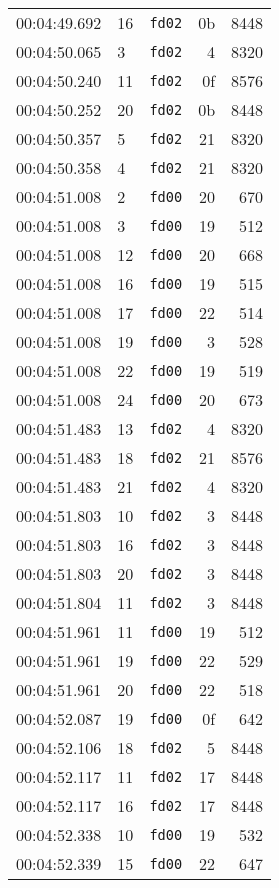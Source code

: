 \documentclass{article}
\begin{document}
\begin{longtable}{lllrr}
00:04:49.692 & 16 & \texttt{fd02} & 0b & 8448 \\
00:04:50.065 & 3 & \texttt{fd02} & 4 & 8320 \\
00:04:50.240 & 11 & \texttt{fd02} & 0f & 8576 \\
00:04:50.252 & 20 & \texttt{fd02} & 0b & 8448 \\
00:04:50.357 & 5 & \texttt{fd02} & 21 & 8320 \\
00:04:50.358 & 4 & \texttt{fd02} & 21 & 8320 \\
00:04:51.008 & 2 & \texttt{fd00} & 20 & 670 \\
00:04:51.008 & 3 & \texttt{fd00} & 19 & 512 \\
00:04:51.008 & 12 & \texttt{fd00} & 20 & 668 \\
00:04:51.008 & 16 & \texttt{fd00} & 19 & 515 \\
00:04:51.008 & 17 & \texttt{fd00} & 22 & 514 \\
00:04:51.008 & 19 & \texttt{fd00} & 3 & 528 \\
00:04:51.008 & 22 & \texttt{fd00} & 19 & 519 \\
00:04:51.008 & 24 & \texttt{fd00} & 20 & 673 \\
00:04:51.483 & 13 & \texttt{fd02} & 4 & 8320 \\
00:04:51.483 & 18 & \texttt{fd02} & 21 & 8576 \\
00:04:51.483 & 21 & \texttt{fd02} & 4 & 8320 \\
00:04:51.803 & 10 & \texttt{fd02} & 3 & 8448 \\
00:04:51.803 & 16 & \texttt{fd02} & 3 & 8448 \\
00:04:51.803 & 20 & \texttt{fd02} & 3 & 8448 \\
00:04:51.804 & 11 & \texttt{fd02} & 3 & 8448 \\
00:04:51.961 & 11 & \texttt{fd00} & 19 & 512 \\
00:04:51.961 & 19 & \texttt{fd00} & 22 & 529 \\
00:04:51.961 & 20 & \texttt{fd00} & 22 & 518 \\
00:04:52.087 & 19 & \texttt{fd00} & 0f & 642 \\
00:04:52.106 & 18 & \texttt{fd02} & 5 & 8448 \\
00:04:52.117 & 11 & \texttt{fd02} & 17 & 8448 \\
00:04:52.117 & 16 & \texttt{fd02} & 17 & 8448 \\
00:04:52.338 & 10 & \texttt{fd00} & 19 & 532 \\
00:04:52.339 & 15 & \texttt{fd00} & 22 & 647 \\

\end{longtable}
\end{document}
